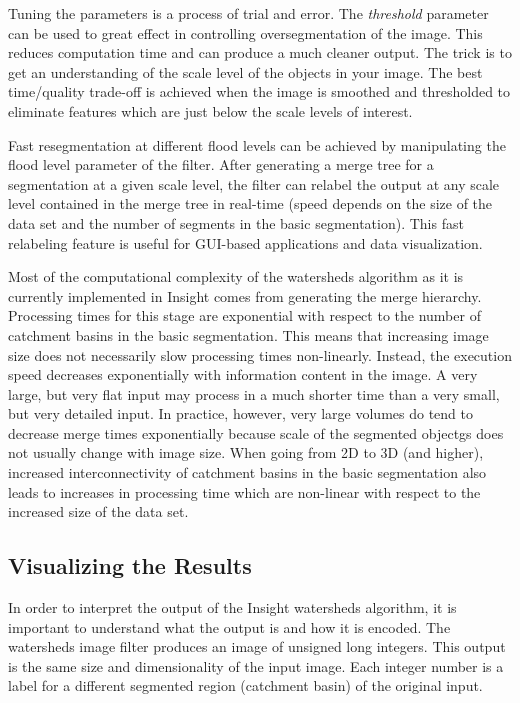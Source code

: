 Tuning the parameters is a process of trial and error.  The {\em threshold}
parameter can be used to great effect in controlling oversegmentation of the
image.  This reduces computation time and can produce a much cleaner output.
The trick is to get an understanding of the scale level of the objects in your
image.  The best time/quality trade-off is achieved when the image is smoothed
and thresholded to eliminate features which are just below the scale levels of
interest.

Fast resegmentation at different flood levels can be achieved by manipulating
the flood level parameter of the filter.  After generating a merge tree for a
segmentation at a given scale level, the filter can relabel the output at any
scale level contained in the merge tree in real-time (speed depends on the size
of the data set and the number of segments in the basic segmentation).  This
fast relabeling feature is useful for GUI-based applications and data
visualization.

Most of the computational complexity of the watersheds algorithm as it is
currently implemented in Insight comes from generating the merge
hierarchy. Processing times for this stage are exponential with respect to the
number of catchment basins in the basic segmentation. This means that
increasing image size does not necessarily slow processing times non-linearly.
Instead, the execution speed decreases exponentially with information content
in the image.  A very large, but very flat input may process in a much shorter
time than a very small, but very detailed input.  In practice, however, very
large volumes do tend to decrease merge times exponentially because scale of
the segmented objectgs does not usually change with image size.  When
going from 2D to 3D (and higher), increased interconnectivity of catchment
basins in the basic segmentation also leads to increases in processing time
which are non-linear with respect to the increased size of the data set.

\subsection{Visualizing the Results}
\label{sec:VisualizingWatersheds}
In order to interpret the output of the Insight watersheds algorithm, it is
important to understand what the output is and how it is encoded.  The
watersheds image filter produces an image of unsigned long integers.  This
output is the same size and dimensionality of the input image.  Each integer
number is a label for a different segmented region (catchment basin) of the
original input.  

